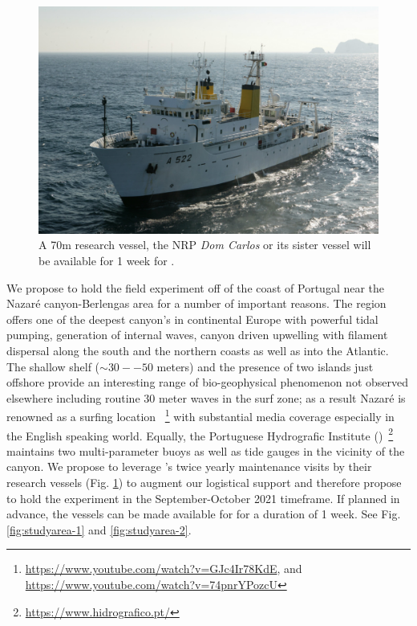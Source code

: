 \begin{figure}
  \vspace{-0.5cm}
  \centering
  \includegraphics[scale=2]{fig/dom-carlos.jpg}
  \caption{A 70m research vessel, the NRP \emph{Dom Carlos} or its
    sister vessel will be available for 1 week for \proje.}
  \vspace{-0.3cm}
 \label{fig:vessel}
\end{figure}


We propose to hold the field experiment off of the coast of Portugal
near the Nazar\'e canyon-Berlengas area for a number of important
reasons. The region offers one of the deepest canyon's in continental
Europe with powerful tidal pumping, generation of internal waves,
canyon driven upwelling with filament dispersal along the south and
the northern coasts as well as into the Atlantic. The shallow shelf
($\sim 30--50$ meters) and the presence of two islands just offshore
provide an interesting range of bio-geophysical phenomenon not
observed elsewhere including routine 30 meter waves in the surf zone;
as a result Nazar\'e is renowned as a surfing location
~\footnote{\url{https://www.youtube.com/watch?v=GJc4Ir78KdE}, and
  \url{https://www.youtube.com/watch?v=74pnrYPozcU}} with substantial
media coverage especially in the English speaking world.  Equally, the
Portuguese Hydrografic Institute
(\inste)~\footnote{\url{https://www.hidrografico.pt/}} maintains two
multi-parameter buoys as well as tide gauges in the vicinity of the
canyon. We propose to leverage \inste's twice yearly maintenance
visits by their research vessels (Fig. \ref{fig:vessel}) to augment
our logistical support and therefore propose to hold the experiment in
the September-October 2021 timeframe. If planned in advance, the
vessels can be made available for \proj for a duration of 1 week. See
Fig. \ref{fig:studyarea-1} and \ref{fig:studyarea-2}.

